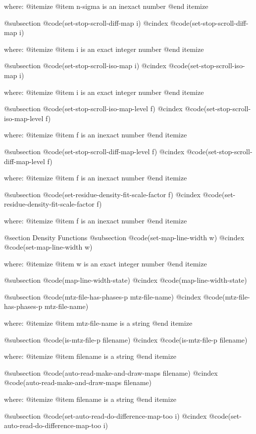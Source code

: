 where: 
 @itemize 
     @item n-sigma is an inexact number
 @end itemize


@subsection @code{(set-stop-scroll-diff-map i)}
@cindex @code{(set-stop-scroll-diff-map i)}
 
where: 
 @itemize 
     @item i is an exact integer number
 @end itemize


@subsection @code{(set-stop-scroll-iso-map i)}
@cindex @code{(set-stop-scroll-iso-map i)}
 
where: 
 @itemize 
     @item i is an exact integer number
 @end itemize


@subsection @code{(set-stop-scroll-iso-map-level f)}
@cindex @code{(set-stop-scroll-iso-map-level f)}
 
where: 
 @itemize 
     @item f is an inexact number
 @end itemize


@subsection @code{(set-stop-scroll-diff-map-level f)}
@cindex @code{(set-stop-scroll-diff-map-level f)}
 
where: 
 @itemize 
     @item f is an inexact number
 @end itemize


@subsection @code{(set-residue-density-fit-scale-factor f)}
@cindex @code{(set-residue-density-fit-scale-factor f)}
 
where: 
 @itemize 
     @item f is an inexact number
 @end itemize



@section Density Functions 
@subsection @code{(set-map-line-width w)}
@cindex @code{(set-map-line-width w)}
 
where: 
 @itemize 
     @item w is an exact integer number
 @end itemize


@subsection @code{(map-line-width-state)}
@cindex @code{(map-line-width-state)}
 
@subsection @code{(mtz-file-has-phases-p mtz-file-name)}
@cindex @code{(mtz-file-has-phases-p mtz-file-name)}
 
where: 
 @itemize 
     @item mtz-file-name is a string
 @end itemize


@subsection @code{(is-mtz-file-p filename)}
@cindex @code{(is-mtz-file-p filename)}
 
where: 
 @itemize 
     @item filename is a string
 @end itemize


@subsection @code{(auto-read-make-and-draw-maps filename)}
@cindex @code{(auto-read-make-and-draw-maps filename)}
 
where: 
 @itemize 
     @item filename is a string
 @end itemize


@subsection @code{(set-auto-read-do-difference-map-too i)}
@cindex @code{(set-auto-read-do-difference-map-too i)}
 
